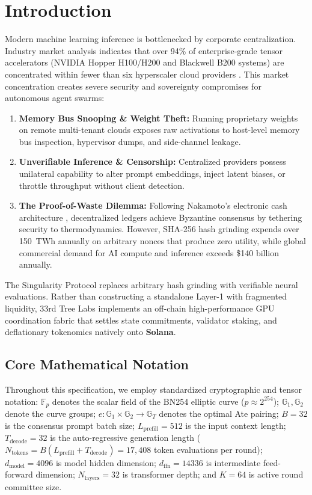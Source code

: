 \documentclass[10pt,twocolumn,letterpaper]{article}
\begin{document}
\section{Introduction}
Modern machine learning inference is bottlenecked by corporate centralization. Industry market analysis indicates that over 94\% of enterprise-grade tensor accelerators (NVIDIA Hopper H100/H200 and Blackwell B200 systems) are concentrated within fewer than six hyperscaler cloud providers \cite{trendforce2024}. This market concentration creates severe security and sovereignty compromises for autonomous agent swarms:
\begin{enumerate}
    \item \textbf{Memory Bus Snooping \& Weight Theft:} Running proprietary weights on remote multi-tenant clouds exposes raw activations to host-level memory bus inspection, hypervisor dumps, and side-channel leakage.
    \item \textbf{Unverifiable Inference \& Censorship:} Centralized providers possess unilateral capability to alter prompt embeddings, inject latent biases, or throttle throughput without client detection.
    \item \textbf{The Proof-of-Waste Dilemma:} Following Nakamoto's electronic cash architecture \cite{nakamoto2008bitcoin}, decentralized ledgers achieve Byzantine consensus by tethering security to thermodynamics. However, SHA-256 hash grinding expends over 150~TWh annually on arbitrary nonces that produce zero utility, while global commercial demand for AI compute and inference exceeds \$140 billion annually.
\end{enumerate}

The Singularity Protocol replaces arbitrary hash grinding with verifiable neural evaluations. Rather than constructing a standalone Layer-1 with fragmented liquidity, 33rd Tree Labs implements an off-chain high-performance GPU coordination fabric that settles state commitments, validator staking, and deflationary tokenomics natively onto \textbf{Solana}.

\subsection{Core Mathematical Notation}
Throughout this specification, we employ standardized cryptographic and tensor notation: $\mathbb{F}_p$ denotes the scalar field of the BN254 elliptic curve ($p \approx 2^{254}$); $\mathbb{G}_1, \mathbb{G}_2$ denote the curve groups; $e: \mathbb{G}_1 \times \mathbb{G}_2 \to \mathbb{G}_T$ denotes the optimal Ate pairing; $B = 32$ is the consensus prompt batch size; $L_{\text{prefill}} = 512$ is the input context length; $T_{\text{decode}} = 32$ is the auto-regressive generation length ($N_{\text{tokens}} = B(L_{\text{prefill}} + T_{\text{decode}}) = 17{,}408$ token evaluations per round); $d_{\text{model}} = 4096$ is model hidden dimension; $d_{\text{ffn}} = 14336$ is intermediate feed-forward dimension; $N_{\text{layers}} = 32$ is transformer depth; and $K = 64$ is active round committee size.
\end{document}
